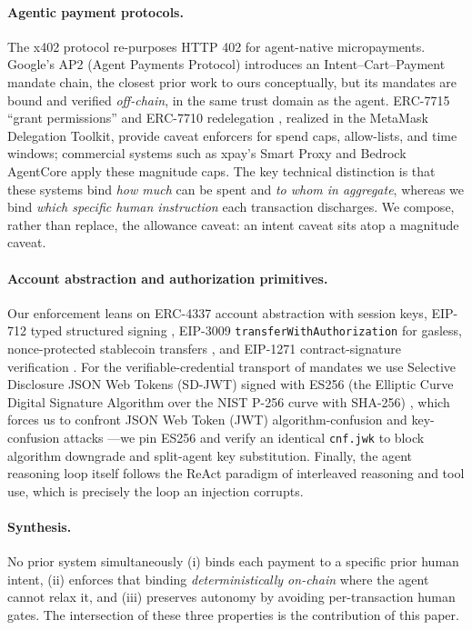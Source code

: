 \documentclass[10pt,twocolumn,letterpaper]{article}
\begin{document}
\paragraph{Agentic payment protocols.} The x402 protocol \cite{x402} re-purposes HTTP 402 for agent-native micropayments. Google's AP2 (Agent Payments Protocol) \cite{ap2} introduces an Intent--Cart--Payment mandate chain, the closest prior work to ours conceptually, but its mandates are bound and verified \emph{off-chain}, in the same trust domain as the agent. ERC-7715 ``grant permissions'' \cite{erc7715} and ERC-7710 redelegation \cite{erc7710}, realized in the MetaMask Delegation Toolkit, provide caveat enforcers for spend caps, allow-lists, and time windows; commercial systems such as xpay's Smart Proxy and Bedrock AgentCore apply these magnitude caps. The key technical distinction is that these systems bind \emph{how much} can be spent and \emph{to whom in aggregate}, whereas we bind \emph{which specific human instruction} each transaction discharges. We compose, rather than replace, the allowance caveat: an intent caveat sits atop a magnitude caveat.

\paragraph{Account abstraction and authorization primitives.} Our enforcement leans on ERC-4337 account abstraction \cite{erc4337} with session keys, EIP-712 typed structured signing \cite{eip712}, EIP-3009 \texttt{transferWithAuthorization} for gasless, nonce-protected stablecoin transfers \cite{eip3009}, and EIP-1271 contract-signature verification \cite{eip1271}. For the verifiable-credential transport of mandates we use Selective Disclosure JSON Web Tokens (SD-JWT) signed with ES256 (the Elliptic Curve Digital Signature Algorithm over the NIST P-256 curve with SHA-256) \cite{sdjwt}, which forces us to confront JSON Web Token (JWT) algorithm-confusion and key-confusion attacks \cite{jwtattacks}---we pin ES256 and verify an identical \texttt{cnf.jwk} to block algorithm downgrade and split-agent key substitution. Finally, the agent reasoning loop itself follows the ReAct paradigm \cite{react} of interleaved reasoning and tool use, which is precisely the loop an injection corrupts.

\paragraph{Synthesis.} No prior system simultaneously (i) binds each payment to a specific prior human intent, (ii) enforces that binding \emph{deterministically on-chain} where the agent cannot relax it, and (iii) preserves autonomy by avoiding per-transaction human gates. The intersection of these three properties is the contribution of this paper.
\end{document}
